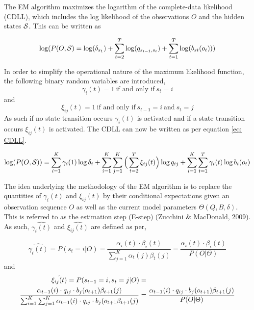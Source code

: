 The EM algorithm maximizes the logarithm of the complete-data likelihood (CDLL), which includes the log likelihood of the observations $O$ and the hidden states $\S$. This can be written as

\begin{equation}
    \log(P(O,\S) = \log(\delta_{s_1}) + \sum_{t=2}^T \log(q_{s_{t-1},s_t})+\sum_{t=1}^T \log(b_{st}(o_t)))
    \label{eq: alternative_log_likelihood}
\end{equation}

In order to simplify the operational nature of the maximum likelihood function, the following binary random variables are introduced,
$$
\gamma_i(t) = 1 \ \text{if and only if}\ s_t = i
$$
and
$$
\xi_{ij}(t) = 1 \ \text{if and only if}\ s_{t-1}=i\ \text{and}\ s_t = j
$$
As such if no state transition occurs $\gamma_i(t)$ is activated and if a state transition occurs $\xi_{ij}(t)$ is activated. The CDLL can now be written as per equation \ref{eq: CDLL}.

\begin{equation}
    \log(P(O, \S)) = \sum_{i=1}^K \gamma_i(1) \log\delta_i + \sum_{i=1}^K \sum_{j=1}^K \Big(\sum_{t=2}^T \xi_{ij}(t)\Big) \log q_{ij}+ \sum_{i=1}^K \sum_{t=1}^T \gamma_i(t) \log b_i(o_t) 
    \label{eq: CDLL}
\end{equation}

The idea underlying the methodology of the EM algorithm is to replace the quantities of $\gamma_i(t)$ and $\xi_{ij}(t)$ by their conditional expectations given an observation sequence $O$ as well as the current model parameters $\Theta(Q, B,\delta)$. This is referred to as the estimation step (E-step) (Zucchini \& MacDonald, 2009). As such, $\hat{\gamma_i(t)}$ and $\hat{\xi_{ij}(t)}$ are defined as per,

\begin{equation}
    \hat{\gamma_i(t)} = P(s_t=i | O) = \frac{\alpha_i(t) \cdot \beta_i(t)}{\sum_{j=1}^K \alpha_t(j)\beta_t(j)} = \frac{\alpha_i(t) \cdot \beta_i(t)}{P(O|\Theta)}
    \label{eq: gamma}
\end{equation}
and
\begin{align}
    \hat{\xi_{ij}(t)} = P(s_{t-1}=i, s_t=j|O) &= \label{eq: xi} \\ 
    \frac{\alpha_{t-1}(i) \cdot q_{ij} \cdot b_j(o_{t+1})\beta_{t+1}(j)}
            {\sum_{i=1}^K\sum_{j=1}^K\alpha_{t-1}(i) \cdot q_{ij} \cdot b_j(o_{t+1}\beta_{t+1}(j)}
    &= \frac{\alpha_{t-1}(i) \cdot q_{ij} \cdot b_j(o_{t+1})\beta_{t+1}(j)}{P(O|\Theta)}  \notag
\end{align}

